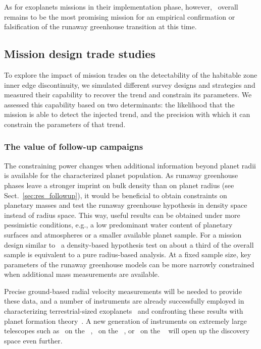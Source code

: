 \documentclass[twocolumn,twocolappendix]{aastex631}
\begin{document}
As for exoplanets missions in their implementation phase, however, \plato\ overall remains to be the most promising mission for an empirical confirmation or falsification of the runaway greenhouse transition at this time.


\subsection{Mission design trade studies}\label{sec:mission-design-trades}
To explore the impact of mission trades on the detectability of the habitable zone inner edge discontinuity, we simulated different survey designs and strategies and measured their capability to recover the trend and constrain its parameters.
We assessed this capability based on two determinants: the likelihood that the mission is able to detect the injected trend, and the precision with which it can constrain the parameters of that trend.

\subsubsection{The value of follow-up campaigns}
The constraining power changes when additional information beyond planet radii is available for the characterized planet population.
As runaway greenhouse phases leave a stronger imprint on bulk density than on planet radius (see Sect.~\ref{sec:res_followup}), it would be beneficial to obtain constraints on planetary masses and test the runaway greenhouse hypothesis in density space instead of radius space.
This way, useful results can be obtained under more pessimistic conditions, e.g., a low predominant water content of planetary surfaces and atmospheres or a smaller available planet sample.
For a mission design similar to \plato\, a density-based hypothesis test on about a third of the overall sample is equivalent to a pure radius-based analysis.
At a fixed sample size, key parameters of the runaway greenhouse models can be more narrowly constrained when additional mass measurements are available.

Precise ground-based radial velocity measurements will be needed to provide these data, and a number of instruments are already successfully employed in characterizing terrestrial-sized exoplanets~\citep[e.g.,][]{Queloz2001a,Pepe2010,Johnson2010b,Ribas2023} and confronting these results with planet formation theory~\citep[e.g.,][]{Miguel2020a,Burn2021,Zawadzki2021a,Schlecker2022}.
A new generation of instruments on extremely large telescopes such as \gclef\ on the \gmt ~\citep{Szentgyorgyi2016}, \andes\ on the \elt ~\citep{Marcantonio2022}, or \modhis\ on the \tmt ~\citep{Mawet2019} will open up the discovery space even further.
\end{document}
